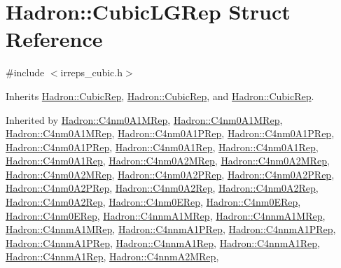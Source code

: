 \hypertarget{structHadron_1_1CubicLGRep}{}\section{Hadron\+:\+:Cubic\+L\+G\+Rep Struct Reference}
\label{structHadron_1_1CubicLGRep}


{\ttfamily \#include $<$irreps\+\_\+cubic.\+h$>$}



Inherits \mbox{\hyperlink{structHadron_1_1CubicRep}{Hadron\+::\+Cubic\+Rep}}, \mbox{\hyperlink{structHadron_1_1CubicRep}{Hadron\+::\+Cubic\+Rep}}, and \mbox{\hyperlink{structHadron_1_1CubicRep}{Hadron\+::\+Cubic\+Rep}}.



Inherited by \mbox{\hyperlink{structHadron_1_1C4nm0A1MRep}{Hadron\+::\+C4nm0\+A1\+M\+Rep}}, \mbox{\hyperlink{structHadron_1_1C4nm0A1MRep}{Hadron\+::\+C4nm0\+A1\+M\+Rep}}, \mbox{\hyperlink{structHadron_1_1C4nm0A1MRep}{Hadron\+::\+C4nm0\+A1\+M\+Rep}}, \mbox{\hyperlink{structHadron_1_1C4nm0A1PRep}{Hadron\+::\+C4nm0\+A1\+P\+Rep}}, \mbox{\hyperlink{structHadron_1_1C4nm0A1PRep}{Hadron\+::\+C4nm0\+A1\+P\+Rep}}, \mbox{\hyperlink{structHadron_1_1C4nm0A1PRep}{Hadron\+::\+C4nm0\+A1\+P\+Rep}}, \mbox{\hyperlink{structHadron_1_1C4nm0A1Rep}{Hadron\+::\+C4nm0\+A1\+Rep}}, \mbox{\hyperlink{structHadron_1_1C4nm0A1Rep}{Hadron\+::\+C4nm0\+A1\+Rep}}, \mbox{\hyperlink{structHadron_1_1C4nm0A1Rep}{Hadron\+::\+C4nm0\+A1\+Rep}}, \mbox{\hyperlink{structHadron_1_1C4nm0A2MRep}{Hadron\+::\+C4nm0\+A2\+M\+Rep}}, \mbox{\hyperlink{structHadron_1_1C4nm0A2MRep}{Hadron\+::\+C4nm0\+A2\+M\+Rep}}, \mbox{\hyperlink{structHadron_1_1C4nm0A2MRep}{Hadron\+::\+C4nm0\+A2\+M\+Rep}}, \mbox{\hyperlink{structHadron_1_1C4nm0A2PRep}{Hadron\+::\+C4nm0\+A2\+P\+Rep}}, \mbox{\hyperlink{structHadron_1_1C4nm0A2PRep}{Hadron\+::\+C4nm0\+A2\+P\+Rep}}, \mbox{\hyperlink{structHadron_1_1C4nm0A2PRep}{Hadron\+::\+C4nm0\+A2\+P\+Rep}}, \mbox{\hyperlink{structHadron_1_1C4nm0A2Rep}{Hadron\+::\+C4nm0\+A2\+Rep}}, \mbox{\hyperlink{structHadron_1_1C4nm0A2Rep}{Hadron\+::\+C4nm0\+A2\+Rep}}, \mbox{\hyperlink{structHadron_1_1C4nm0A2Rep}{Hadron\+::\+C4nm0\+A2\+Rep}}, \mbox{\hyperlink{structHadron_1_1C4nm0ERep}{Hadron\+::\+C4nm0\+E\+Rep}}, \mbox{\hyperlink{structHadron_1_1C4nm0ERep}{Hadron\+::\+C4nm0\+E\+Rep}}, \mbox{\hyperlink{structHadron_1_1C4nm0ERep}{Hadron\+::\+C4nm0\+E\+Rep}}, \mbox{\hyperlink{structHadron_1_1C4nnmA1MRep}{Hadron\+::\+C4nnm\+A1\+M\+Rep}}, \mbox{\hyperlink{structHadron_1_1C4nnmA1MRep}{Hadron\+::\+C4nnm\+A1\+M\+Rep}}, \mbox{\hyperlink{structHadron_1_1C4nnmA1MRep}{Hadron\+::\+C4nnm\+A1\+M\+Rep}}, \mbox{\hyperlink{structHadron_1_1C4nnmA1PRep}{Hadron\+::\+C4nnm\+A1\+P\+Rep}}, \mbox{\hyperlink{structHadron_1_1C4nnmA1PRep}{Hadron\+::\+C4nnm\+A1\+P\+Rep}}, \mbox{\hyperlink{structHadron_1_1C4nnmA1PRep}{Hadron\+::\+C4nnm\+A1\+P\+Rep}}, \mbox{\hyperlink{structHadron_1_1C4nnmA1Rep}{Hadron\+::\+C4nnm\+A1\+Rep}}, \mbox{\hyperlink{structHadron_1_1C4nnmA1Rep}{Hadron\+::\+C4nnm\+A1\+Rep}}, \mbox{\hyperlink{structHadron_1_1C4nnmA1Rep}{Hadron\+::\+C4nnm\+A1\+Rep}}, \mbox{\hyperlink{structHadron_1_1C4nnmA2MRep}{Hadron\+::\+C4nnm\+A2\+M\+Rep}}, 
